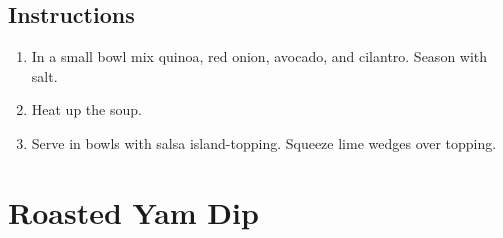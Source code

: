 \documentclass[letterpaper,10pt,english]{sphinxmanual}
\begin{document}

%
\begin{sphinxVerbatim}[commandchars=\\\{\}]
   

    

  

    

   
\end{sphinxVerbatim}


\section{Instructions}
\label{\detokenize{RRPS_Quinoa_Salsa:instructions}}\begin{enumerate}
\item {} 
In a small bowl mix quinoa, red onion, avocado, and cilantro. Season with salt.

\item {} 
Heat up the soup.

\item {} 
Serve in bowls with salsa island-topping. Squeeze lime wedges over topping.

\end{enumerate}


\chapter{Roasted Yam Dip}
\label{\detokenize{roasted_yam_dip:roasted-yam-dip}}\label{\detokenize{roasted_yam_dip::doc}}
\end{document}
